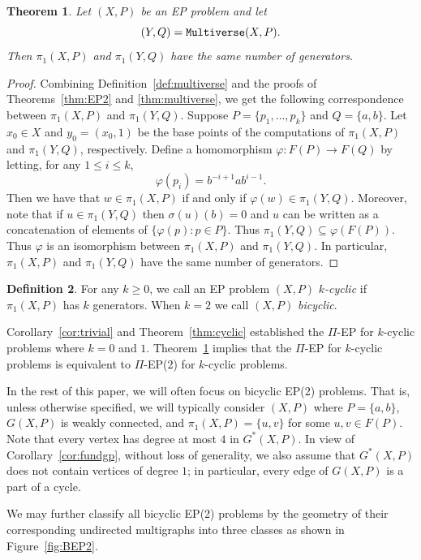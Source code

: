 \documentclass[10pt,a4paper]{amsart}
\newtheorem{theorem}{Theorem}[section]
\theoremstyle{definition}
\newtheorem{definition}[theorem]{Definition}
\theoremstyle{definition}
\numberwithin{equation}{section}
\begin{document}
\begin{theorem}\label{thm:kcyclic} Let $(X, P)$ be an EP problem and let
$$ (Y, Q)=\mbox{\tt Multiverse}(X, P). $$
Then $\pi_1(X, P)$ and $\pi_1(Y, Q)$ have the same number of generators.
\end{theorem}

\begin{proof} Combining Definition~\ref{def:multiverse} and the proofs of Theorems~\ref{thm:EP2} and \ref{thm:multiverse}, we get the following correspondence between $\pi_1(X, P)$ and $\pi_1(Y, Q)$. Suppose $P=\{p_1,\dots, p_k\}$ and $Q=\{a, b\}$. Let $x_0\in X$ and $y_0=(x_0,1)$ be the base points of the computations of $\pi_1(X, P)$ and $\pi_1(Y, Q)$, respectively. Define a homomorphism $\varphi\colon F(P)\to F(Q)$ by letting, for any $1\leq i\leq k$,
$$ \varphi(p_i)=b^{-i+1}ab^{i-1}. $$
Then we have that $w\in \pi_1(X, P)$ if and only if $\varphi(w)\in \pi_1(Y, Q)$. Moreover, note that if $u\in \pi_1(Y, Q)$ then $\sigma(u)(b)=0$ and $u$ can be written as a concatenation of elements of $\{\varphi(p)\colon p\in P\}$. Thus $\pi_1(Y, Q)\subseteq \varphi(F(P))$. Thus $\varphi$ is an isomorphism between $\pi_1(X, P)$ and $\pi_1(Y, Q)$. In particular, $\pi_1(X, P)$ and $\pi_1(Y, Q)$ have the same number of generators.
\end{proof}

\begin{definition} For any $k\geq 0$, we call an EP problem $(X, P)$ {\em $k$-cyclic} if $\pi_1(X, P)$ has $k$ generators. When $k=2$ we call $(X, P)$ {\em bicyclic}.
\end{definition}

Corollary~\ref{cor:trivial} and Theorem~\ref{thm:cyclic} established the $\Pi$-EP for $k$-cyclic problems where $k=0$ and $1$. Theorem~\ref{thm:kcyclic} implies that the $\Pi$-EP for $k$-cyclic problems is equivalent to $\Pi$-EP(2) for $k$-cyclic problems. 

In the rest of this paper, we will often focus on bicyclic EP(2) problems. That is, unless otherwise specified, we will typically consider $(X, P)$ where $P=\{a, b\}$, $G(X, P)$ is weakly connected, and $\pi_1(X, P)=\{u, v\}$ for some $u, v\in F(P)$. Note that every vertex has degree at most $4$ in $G^*(X, P)$. In view of Corollary~\ref{cor:fundgp}, without loss of generality, we also assume that $G^*(X, P)$ does not contain vertices of degree $1$; in particular, every edge of $G(X, P)$ is a part of a cycle. 

We may further classify all bicyclic EP(2) problems by the geometry of their corresponding undirected multigraphs into three classes as shown in Figure~\ref{fig:BEP2}.
\end{document}
